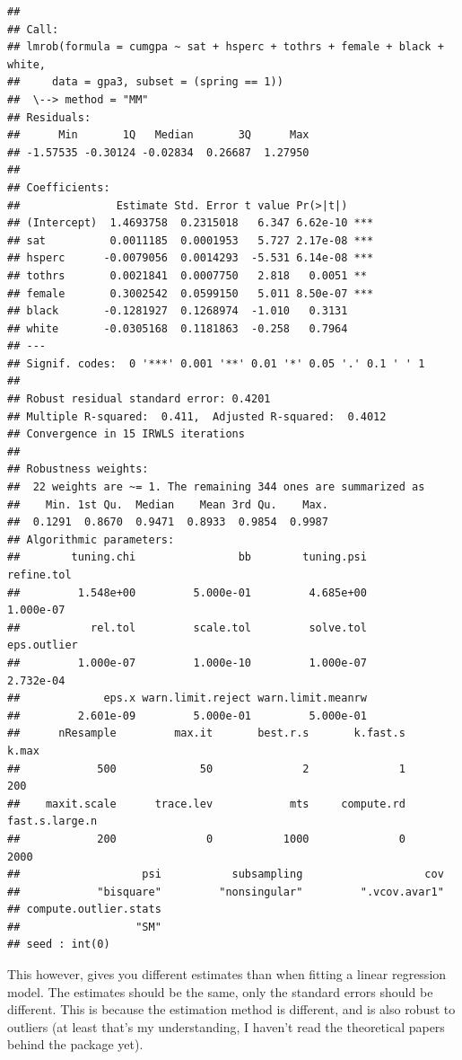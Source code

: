 \documentclass[]{book}
\begin{document}
\begin{verbatim}
## 
## Call:
## lmrob(formula = cumgpa ~ sat + hsperc + tothrs + female + black + white, 
##     data = gpa3, subset = (spring == 1))
##  \--> method = "MM"
## Residuals:
##      Min       1Q   Median       3Q      Max 
## -1.57535 -0.30124 -0.02834  0.26687  1.27950 
## 
## Coefficients:
##               Estimate Std. Error t value Pr(>|t|)    
## (Intercept)  1.4693758  0.2315018   6.347 6.62e-10 ***
## sat          0.0011185  0.0001953   5.727 2.17e-08 ***
## hsperc      -0.0079056  0.0014293  -5.531 6.14e-08 ***
## tothrs       0.0021841  0.0007750   2.818   0.0051 ** 
## female       0.3002542  0.0599150   5.011 8.50e-07 ***
## black       -0.1281927  0.1268974  -1.010   0.3131    
## white       -0.0305168  0.1181863  -0.258   0.7964    
## ---
## Signif. codes:  0 '***' 0.001 '**' 0.01 '*' 0.05 '.' 0.1 ' ' 1
## 
## Robust residual standard error: 0.4201 
## Multiple R-squared:  0.411,  Adjusted R-squared:  0.4012 
## Convergence in 15 IRWLS iterations
## 
## Robustness weights: 
##  22 weights are ~= 1. The remaining 344 ones are summarized as
##    Min. 1st Qu.  Median    Mean 3rd Qu.    Max. 
##  0.1291  0.8670  0.9471  0.8933  0.9854  0.9987 
## Algorithmic parameters: 
##        tuning.chi                bb        tuning.psi        refine.tol 
##         1.548e+00         5.000e-01         4.685e+00         1.000e-07 
##           rel.tol         scale.tol         solve.tol       eps.outlier 
##         1.000e-07         1.000e-10         1.000e-07         2.732e-04 
##             eps.x warn.limit.reject warn.limit.meanrw 
##         2.601e-09         5.000e-01         5.000e-01 
##      nResample         max.it       best.r.s       k.fast.s          k.max 
##            500             50              2              1            200 
##    maxit.scale      trace.lev            mts     compute.rd fast.s.large.n 
##            200              0           1000              0           2000 
##                   psi           subsampling                   cov 
##            "bisquare"         "nonsingular"         ".vcov.avar1" 
## compute.outlier.stats 
##                  "SM" 
## seed : int(0)
\end{verbatim}

This however, gives you different estimates than when fitting a linear
regression model. The estimates should be the same, only the standard
errors should be different. This is because the estimation method is
different, and is also robust to outliers (at least that's my
understanding, I haven't read the theoretical papers behind the package
yet).
\end{document}
